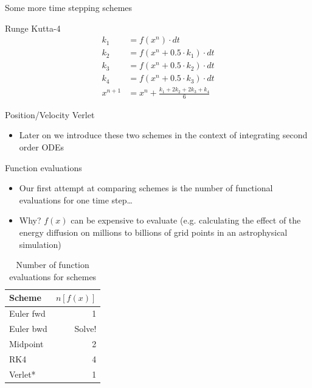 \documentclass[presentation]{beamer}
\begin{document}
\begin{frame}[label={sec:org20a27fa}]{Some more time stepping schemes}
\begin{block}{Runge Kutta-4}
\begin{equation*}
\begin{aligned}
{k}_1 &= {f}({x}^{n}) \cdot dt \\
{k}_2 &= {f}({x}^{n} + 0.5 \cdot {k}_1)\cdot dt \\
{k}_3 &= {f}({x}^{n} + 0.5 \cdot {k}_2)\cdot dt \\
{k}_4 &= {f}({x}^{n} + 0.5 \cdot {k}_3)\cdot dt \\
{x}^{n+1} &= {x}^{n} + \frac{{k}_1+2{k}_2+2{k}_3+{k}_4}{6}
\end{aligned}
\end{equation*}
\end{block}
\begin{block}{Position/Velocity Verlet}
\begin{itemize}
\item Later on we introduce these two schemes in the context of integrating
second order ODEs
\end{itemize}
\end{block}
\end{frame}
\begin{frame}[label={sec:org7817cbc}]{Function evaluations}
\begin{itemize}
\item Our first attempt at comparing schemes is the number of functional
evaluations for one time step\ldots{}
\item Why? \(f(x)\) can be expensive to evaluate (e.g. calculating the effect
of the energy diffusion on millions to billions of
grid points in an astrophysical simulation)
\end{itemize}
\begin{table}[htbp]
\caption{\label{tab_sym_snake_params}
Number of function evaluations for schemes}
\centering
\begin{tabular}{lr}
\toprule
Scheme & \(n[f(x)]\)\\
\midrule
Euler fwd & 1\\
Euler bwd & Solve!\\
Midpoint & 2\\
RK4 & 4\\
Verlet* & 1\\
\bottomrule
\end{tabular}
\end{table}
\end{frame}
\end{document}
